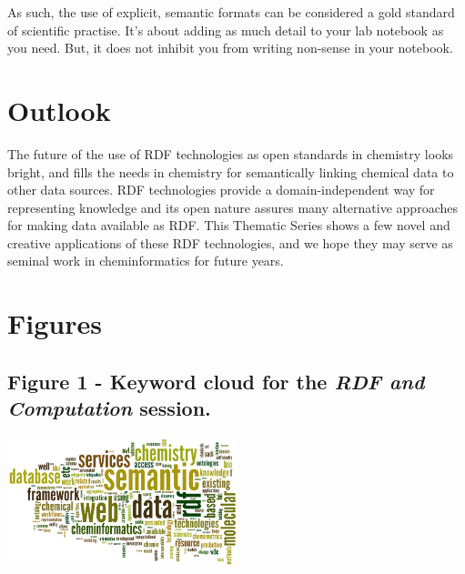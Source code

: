 \documentclass[10pt]{bmc_article}
\newenvironment{bmcformat}{\begin{raggedright}\baselineskip20pt\sloppy\setboolean{publ}{false}}{\end{raggedright}\baselineskip20pt\sloppy}
\begin{document}
\begin{bmcformat}
As such, the use of explicit, semantic formats can be considered
a gold standard of scientific practise. It's about adding as much detail
to your lab notebook as you need. But, it does not inhibit you
from writing non-sense in your notebook.

\section{Outlook}

The future of the use of RDF technologies as open standards in chemistry looks
bright, and fills the needs in chemistry for semantically linking
chemical data to other data sources. RDF technologies provide a
domain-independent way for representing knowledge and its open
nature assures many alternative approaches for making data available
as RDF.
This Thematic Series shows a few novel and creative applications of
these RDF technologies, and we hope they may serve as seminal work
in cheminformatics for future years.



{
   }     %



\clearpage

\section*{Figures}

  \subsection*{Figure 1 - Keyword cloud for the \textit{RDF and Computation} session.}
  \includegraphics[width=0.5\textwidth]{graphics/wordle_cinf003} 


\end{bmcformat}
\end{document}
